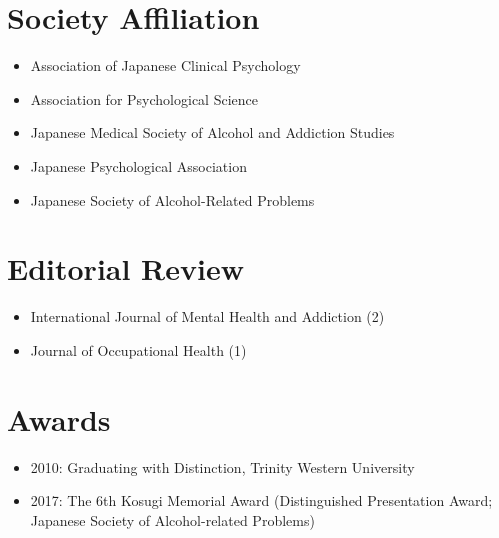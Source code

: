\documentclass{article}
\begin{document}
\section{Society Affiliation}
\begin{itemize}
	\item Association of Japanese Clinical Psychology
	\item Association for Psychological Science
	\item Japanese Medical Society of Alcohol and Addiction Studies
	\item Japanese Psychological Association
	\item Japanese Society of Alcohol-Related Problems
\end{itemize}

\section{Editorial Review}
\begin{itemize}
	\item International Journal of Mental Health and Addiction (2)
	\item Journal of Occupational Health (1)
\end{itemize}

\section{Awards}
	\begin{itemize}
		\item 2010: Graduating with Distinction, Trinity Western University
		\item 2017: The 6th Kosugi Memorial Award (Distinguished Presentation Award; Japanese Society of Alcohol-related Problems)
	\end{itemize}
\end{document}
